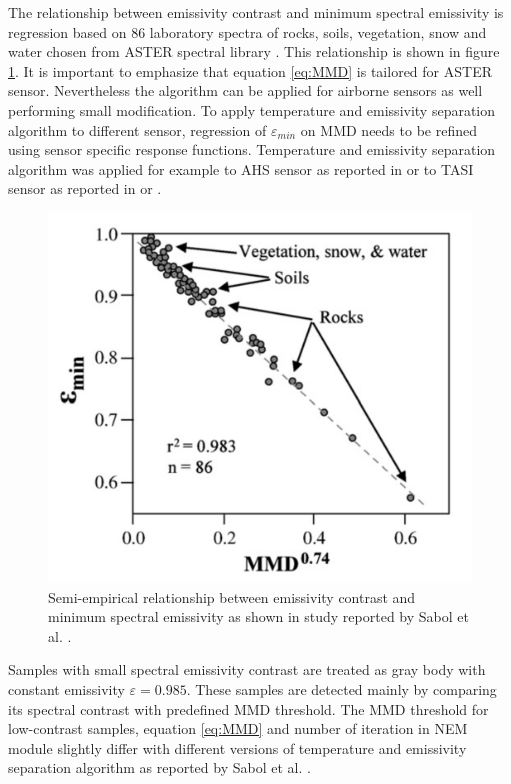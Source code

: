 The relationship between emissivity contrast and minimum spectral emissivity is regression based on 86 laboratory spectra of rocks, soils, vegetation, snow and water chosen from ASTER spectral library \cite{BH09}. This relationship is shown in figure \ref{fig:EpsMinMMD}. It is important to emphasize that equation \ref{eq:MMD} is tailored for ASTER sensor. Nevertheless the algorithm can be applied for airborne sensors as well performing small modification. To apply temperature and emissivity separation algorithm to different sensor, regression of $\varepsilon_{min}$ on MMD needs to be refined using sensor specific response functions. Temperature and emissivity separation algorithm was applied for example to AHS sensor as reported in \cite{SJ06} or to TASI sensor as reported in \cite{PP12} or \cite{WQ11}.
\begin{figure}[htb]
	\centering
	\includegraphics[scale=0.2]{pics/Chapter_03/EpsMinMMD.png}
	\caption{Semi-empirical relationship between emissivity contrast and minimum spectral emissivity as shown in study reported by Sabol et al. \cite{SG09}.}
	\label{fig:EpsMinMMD}
\end{figure}

Samples with small spectral emissivity contrast are treated as gray body with constant emissivity $\varepsilon=0.985$. These samples are detected mainly by comparing its spectral contrast with predefined MMD threshold. The MMD threshold for low-contrast samples, equation \ref{eq:MMD} and number of iteration in NEM module slightly differ with different versions of temperature and emissivity separation algorithm as reported by Sabol et al. \cite{SG09}.

